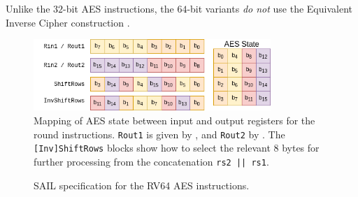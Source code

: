 Unlike the $32$-bit AES instructions, the $64$-bit variants
{\em do not} use the Equivalent Inverse Cipher
construction \cite[Section 5.3.5]{nist:fips:197}.

\begin{figure}[h]
\centering
\includegraphics[width=0.8\textwidth]{diagrams/aes-rv64-state.png}
\caption{
Mapping of AES state between input and output registers for the round
instructions.
{\tt Rout1} is given by ,
and
{\tt Rout2}          by .
The {\tt [Inv]ShiftRows} blocks show how to select the relevant $8$ bytes
for further processing from the concatenation {\tt rs2 || \tt rs1}.
}
\label{fig:aes:rv64:mapping}
\end{figure}

\begin{figure}[h!]

\caption{
SAIL specification for the RV64 AES instructions.
}
\label{fig:pesudo:aes:rv64}
\end{figure}

